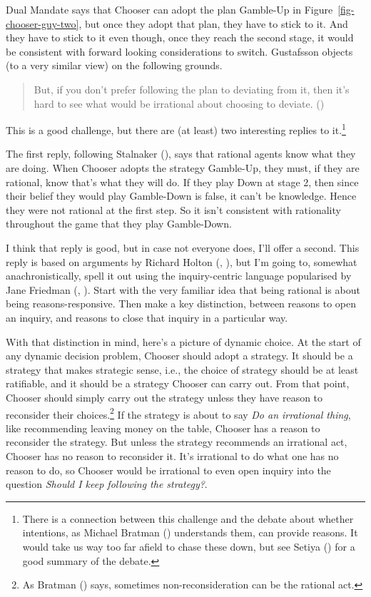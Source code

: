 \documentclass[
  10pt,
  letterpaper,
  DIV=11,
  numbers=noendperiod,
  twoside]{scrartcl}
\begin{document}
Dual Mandate says that Chooser can adopt the plan Gamble-Up in
Figure~\ref{fig-chooser-guy-two}, but once they adopt that plan, they
have to stick to it. And they have to stick to it even though, once they
reach the second stage, it would be consistent with forward looking
considerations to switch. Gustafsson objects (to a very similar view) on
the following grounds.

\begin{quote}
But, if you don't prefer following the plan to deviating from it, then
it's hard to see what would be irrational about choosing to deviate.
()
\end{quote}

This is a good challenge, but there are (at least) two interesting
replies to it.\footnote{There is a connection between this challenge and
  the debate about whether intentions, as Michael Bratman
  () understands them, can provide
  reasons. It would take us way too far afield to chase these down, but
  see Setiya () for a good
  summary of the debate.}

The first reply, following Stalnaker
(), says that rational agents know
what they are doing. When Chooser adopts the strategy Gamble-Up, they
must, if they are rational, know that's what they will do. If they play
Down at stage 2, then since their belief they would play Gamble-Down is
false, it can't be knowledge. Hence they were not rational at the first
step. So it isn't consistent with rationality throughout the game that
they play Gamble-Down.

I think that reply is good, but in case not everyone does, I'll offer a
second. This reply is based on arguments by Richard Holton
(, ), but
I'm going to, somewhat anachronistically, spell it out using the
inquiry-centric language popularised by Jane Friedman
(, ).
Start with the very familiar idea that being rational is about being
reasons-responsive. Then make a key distinction, between reasons to open
an inquiry, and reasons to close that inquiry in a particular way.

With that distinction in mind, here's a picture of dynamic choice. At
the start of any dynamic decision problem, Chooser should adopt a
strategy. It should be a strategy that makes strategic sense, i.e., the
choice of strategy should be at least ratifiable, and it should be a
strategy Chooser can carry out. From that point, Chooser should simply
carry out the strategy unless they have reason to reconsider their
choices.\footnote{As Bratman () says,
  sometimes non-reconsideration can be the rational act.} If the
strategy is about to say \emph{Do an irrational thing}, like
recommending leaving money on the table, Chooser has a reason to
reconsider the strategy. But unless the strategy recommends an
irrational act, Chooser has no reason to reconsider it. It's irrational
to do what one has no reason to do, so Chooser would be irrational to
even open inquiry into the question \emph{Should I keep following the
strategy?}.
\end{document}
